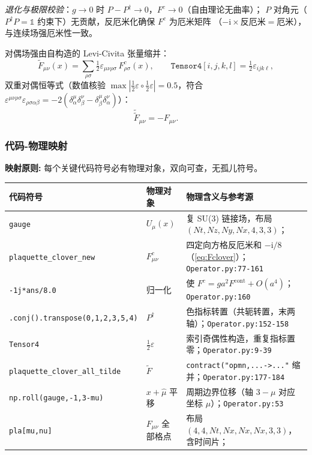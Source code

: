\documentclass[UTF8]{ctexart}
\begin{document}
\emph{退化与极限校验}：$g\to 0$ 时 $P-P^\dagger\to 0$，$F^c\to 0$（自由理论无曲率）；
$P$ 对角元（$P^\dagger P=\mathbb 1$ 约束下）无贡献，反厄米化确保 $F^c$ 为厄米矩阵
（$-\mathrm i\times\text{反厄米}=\text{厄米}$），与连续场强厄米性一致。

对偶场强由自构造的 Levi-Civita 张量缩并：
\begin{equation}\label{eq:tilde}
\widetilde F_{\mu\nu}(x)=\sum_{\rho\sigma}\tfrac12\varepsilon_{\mu\nu\rho\sigma}\,F^{c}_{\rho\sigma}(x),
\qquad
\texttt{Tensor4}[i,j,k,l]=\tfrac12\varepsilon_{ijk\ell},
\end{equation}
双重对偶恒等式（数值核验 $\max|\tfrac12\varepsilon\circ\tfrac12\varepsilon|=0.5$，符合
$\varepsilon^{\mu\nu\rho\sigma}\varepsilon_{\rho\sigma\alpha\beta}
=-2(\delta^\mu_\alpha\delta^\nu_\beta-\delta^\mu_\beta\delta^\nu_\alpha)$）：
\begin{equation}\label{eq:dual2}
\widetilde{\widetilde F}_{\mu\nu}=-F_{\mu\nu}.
\end{equation}

\subsubsection{代码-物理映射}
\begin{mapbox}
\textbf{映射原则:} 每个关键代码符号必有物理对象，双向可查，无孤儿符号。
\end{mapbox}
\begin{xltabular}{\textwidth}{llX}
\toprule
\textcolor{map}{代码符号} & 物理对象 & 物理含义与参考源 \\
\midrule
\endhead
\texttt{gauge} & $U_\mu(x)$ & 复 SU(3) 链接场，布局 $(Nt,Nz,Ny,Nx,4,3,3)$；\\
\texttt{plaquette\_clover\_new} & $F^c_{\mu\nu}$ & 四定向方格反厄米和 $-\mathrm i/8$（\eqref{eq:Fclover}）；\texttt{\nolinkurl{Operator.py:77-161}} \\
\texttt{-1j*ans/8.0} & 归一化 & 使 $F^c=ga^2F^{\mathrm{cont}}+O(a^4)$；\texttt{\nolinkurl{Operator.py:160}} \\
\texttt{.conj().transpose(0,1,2,3,5,4)} & $P^\dagger$ & 色指标转置（共轭转置，末两轴）；\texttt{\nolinkurl{Operator.py:152-158}} \\
\texttt{Tensor4} & $\tfrac12\varepsilon$ & 索引奇偶性构造，重复指标置零；\texttt{\nolinkurl{Operator.py:9-39}} \\
\texttt{plaquette\_clover\_all\_tilde} & $\widetilde F$ & \texttt{contract("opmn,...->..."} 缩并；\texttt{\nolinkurl{Operator.py:177-184}} \\
\texttt{np.roll(gauge,-1,3-mu)} & $x+\hat\mu$ 平移 & 周期边界位移（轴 $3-\mu$ 对应坐标 $\mu$）；\texttt{\nolinkurl{Operator.py:53}} \\
\texttt{pla[mu,nu]} & $F_{\mu\nu}$ 全部格点 & 布局 $(4,4,Nt,Nx,Nx,Nx,3,3)$，含时间片；\\
\bottomrule
\end{xltabular}
\end{document}
